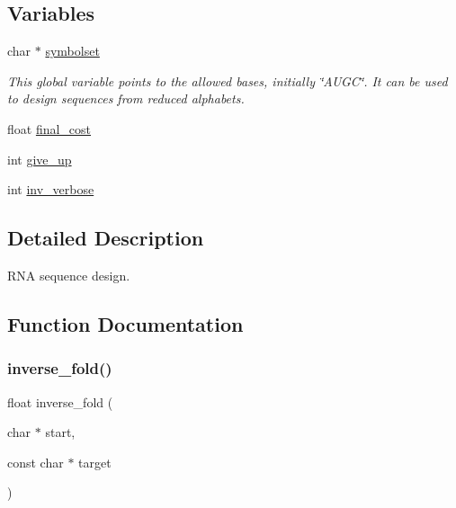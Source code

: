 \subsection*{Variables}
\begin{DoxyCompactItemize}
\item 
\mbox{\label{group__inverse__fold_ga8f791e7740a5a28b9f6fafb4e60301d9}} 
char $\ast$ \hyperlink{group__inverse__fold_ga8f791e7740a5a28b9f6fafb4e60301d9}{symbolset}
\begin{DoxyCompactList}\small\item\em This global variable points to the allowed bases, initially \char`\"{}\+A\+U\+G\+C\char`\"{}. It can be used to design sequences from reduced alphabets. \end{DoxyCompactList}\item 
float \hyperlink{group__inverse__fold_ga7f17d3b169af048d32bb185039a9c09c}{final\+\_\+cost}
\item 
int \hyperlink{group__inverse__fold_ga7ec4ba51f86e1717a1e174264e4a75ce}{give\+\_\+up}
\item 
int \hyperlink{group__inverse__fold_gafcfc65fba01b9cca5946726ed9057a63}{inv\+\_\+verbose}
\end{DoxyCompactItemize}


\subsection{Detailed Description}
R\+NA sequence design. 



\subsection{Function Documentation}
\mbox{\label{group__inverse__fold_ga7af026de55d4babad879f2c92559cbbc}} 
\subsubsection{\texorpdfstring{inverse\+\_\+fold()}{inverse\_fold()}}
{\footnotesize\ttfamily float inverse\+\_\+fold (\begin{DoxyParamCaption}\item[{char $\ast$}]{start,  }\item[{const char $\ast$}]{target }\end{DoxyParamCaption})}



